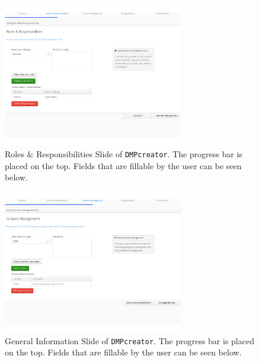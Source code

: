 \begin{figure}[]
	\centering
	\includegraphics[width=0.7\textwidth]{pictures/RolesResponsibilities.png}
	\caption{Roles \& Responsibilities Slide of \texttt{DMPcreator}. The progress bar is placed on the top. Fields that are fillable by the user can be seen below.}
	\label{RolesResponsibilitiesSlide}
\end{figure}

\begin{figure}[]
	\centering
	\includegraphics[width=0.7\textwidth]{pictures/ContentManagement.png}
	\caption{General Information Slide of \texttt{DMPcreator}. The progress bar is placed on the top. Fields that are fillable by the user can be seen below.}
	\label{ContentManagementSlide}
\end{figure}

